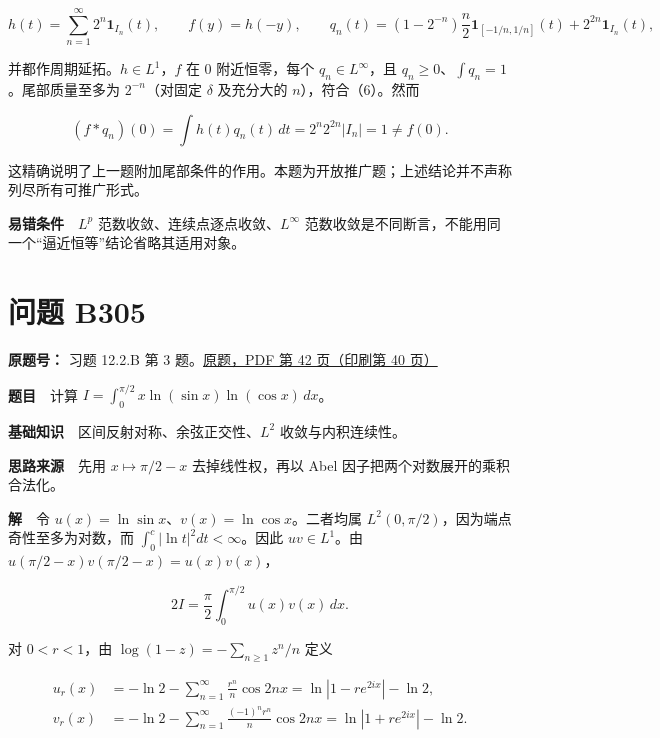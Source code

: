 \documentclass[11pt,a4paper]{article}
\begin{document}
\begin{equation}
h(t)=\sum_{n=1}^{\infty}2^n\mathbf1_{I_n}(t),\qquad
f(y)=h(-y),\qquad
q_n(t)=(1-2^{-n})\frac n2\mathbf1_{[-1/n,1/n]}(t)
+2^{2n}\mathbf1_{I_n}(t),
\tag{10}
\end{equation}

并都作周期延拓。\(h\in L^1\)，\(f\) 在 \(0\) 附近恒零，每个
\(q_n\in L^\infty\)，且 \(q_n\ge0\)、\(\int q_n=1\)。尾部质量至多为
\(2^{-n}\)（对固定 \(\delta\) 及充分大的 \(n\)），符合（6）。然而

\begin{equation}
(f*q_n)(0)=\int h(t)q_n(t)\,dt
=2^n2^{2n}|I_n|=1\ne f(0).
\tag{11}
\end{equation}

这精确说明了上一题附加尾部条件的作用。本题为开放推广题；上述结论并不声称列尽所有可推广形式。

\textbf{易错条件}　\(L^p\) 范数收敛、连续点逐点收敛、\(L^\infty\)
范数收敛是不同断言，不能用同一个``逼近恒等''结论省略其适用对象。

\section{问题 B305}\label{ux95eeux9898-b305}

\textbf{原题号：} 习题 12.2.B 第 3
题。\href{https://zj139.github.io/math-notes/files/problems/楼分析习题-v2.pdf\#page=42}{原题，PDF
第 42 页（印刷第 40 页）}

\textbf{题目}　计算 \(I=\int_0^{\pi/2}x\ln(\sin x)\ln(\cos x)\,dx\)。

\textbf{基础知识}　区间反射对称、余弦正交性、\(L^2\) 收敛与内积连续性。

\textbf{思路来源}　先用 \(x\mapsto\pi/2-x\) 去掉线性权，再以 Abel
因子把两个对数展开的乘积合法化。

\textbf{解}　令 \(u(x)=\ln\sin x\)、\(v(x)=\ln\cos x\)。二者均属
\(L^2(0,\pi/2)\)，因为端点奇性至多为对数，而
\(\int_0^c|\ln t|^2dt<\infty\)。因此 \(uv\in L^1\)。由
\(u(\pi/2-x)v(\pi/2-x)=u(x)v(x)\)，

\begin{equation}
2I=\frac\pi2\int_0^{\pi/2}u(x)v(x)\,dx.
\tag{12}
\end{equation}

对 \(0<r<1\)，由 \(\log(1-z)=-\sum_{n\ge1}z^n/n\) 定义

\begin{equation}
\begin{aligned}
u_r(x)&=-\ln2-\sum_{n=1}^{\infty}\frac{r^n}{n}\cos2nx
=\ln|1-re^{2ix}|-\ln2,\\
v_r(x)&=-\ln2-\sum_{n=1}^{\infty}\frac{(-1)^nr^n}{n}\cos2nx
=\ln|1+re^{2ix}|-\ln2.
\end{aligned}\tag{13}
\end{equation}
\end{document}
